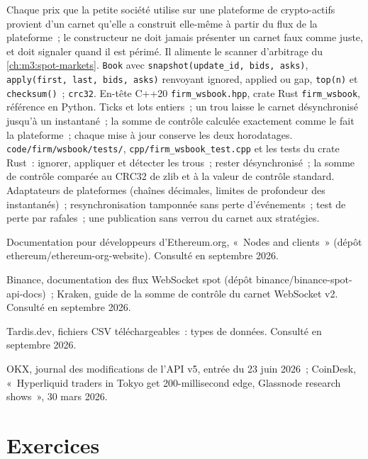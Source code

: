 \begin{build}
 Chaque prix que la petite société utilise sur une plateforme de crypto-actifs provient d'un carnet qu'elle a construit elle-même à partir du flux de la plateforme~; le constructeur ne doit jamais présenter
un carnet faux comme juste, et doit signaler quand il est périmé. Il alimente le scanner d'arbitrage du \cref{ch:m3:spot-markets}.
 \texttt{Book} avec \texttt{snapshot(update\_id, bids, asks)}, \texttt{apply(first, last, bids, asks)} renvoyant ignored, applied ou gap,
\texttt{top(n)} et \texttt{checksum()}~; \texttt{crc32}. En-tête C++20 \texttt{firm\_wsbook.hpp}, crate Rust \texttt{firm\_wsbook}, référence en Python.
 Ticks et lots entiers~; un trou laisse le carnet désynchronisé jusqu'à un instantané~; la somme de contrôle calculée exactement comme le fait la plateforme~; chaque mise à jour conserve les deux
horodatages.
 \texttt{code/firm/wsbook/tests/}, \texttt{cpp/firm\_wsbook\_test.cpp} et les tests du crate Rust~: ignorer, appliquer et détecter les
trous~; rester désynchronisé~; la somme de contrôle comparée au CRC32 de zlib et à la valeur de contrôle standard.
 Adaptateurs de plateformes (chaînes décimales, limites de profondeur des instantanés)~; resynchronisation tamponnée sans perte d'événements~; test de perte par rafales~; une
publication sans verrou du carnet aux stratégies.
\end{build}

\begin{omsources}
\item Documentation pour développeurs d'Ethereum.org, «~Nodes and clients~» (dépôt ethereum/ethereum-org-website). Consulté en septembre 2026.
\item Binance, documentation des flux WebSocket spot (dépôt binance/binance-spot-api-docs)~; Kraken, guide de la somme de contrôle du carnet WebSocket v2. Consulté en septembre 2026.
\item Tardis.dev, fichiers CSV téléchargeables~: types de données. Consulté en septembre 2026.
\item OKX, journal des modifications de l'API v5, entrée du 23 juin 2026~; CoinDesk, «~Hyperliquid traders in Tokyo get 200-millisecond edge, Glassnode research shows~», 30 mars 2026.
\end{omsources}

\section{Exercices}

